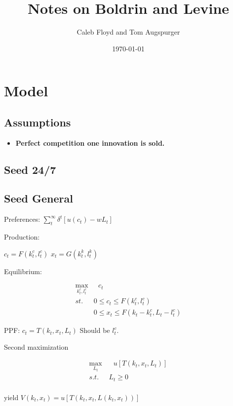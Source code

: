 \documentclass[11pt]{article}
\title{Notes on Boldrin and Levine}
\author{Caleb Floyd and Tom Augspurger}
\date{\today}
\begin{document}
\maketitle

\section{Model}
\label{sec:model}

\subsection{Assumptions}
\label{sub:assumptions}

  \begin{itemize}
    \item \textbf{Perfect competition one innovation is sold.}
  \end{itemize}
\subsection{Seed 24/7}
\label{sub:seed_24_7}

\subsection{Seed General}
\label{sub:seed_general}

  Preferences: $\sum_t^\infty \delta^t [u(c_t) - wL_t]$

  Production:

  $c_t = F(k_t^c, l_t^c)$
  $x_t = G(k_t^k, l_t^k)$

  Equilibrium:

  \begin{align}
    \max_{k^c_t, l^c_t} & \ \ \ c_t\\
    st. & 0 \leq c_t \leq F(k_t^c, l_t^c)\\
        & 0 \leq x_t \leq F(k_t - k_t^c, L_t - l_t^c)
  \end{align}

  PPF: $c_t = T(k_t, x_t, L_t)$ Should be $l^c_t$.

  Second maximization

  \begin{align}
    \max_{L_t} & \ \ \  u[T(k_t, x_t, L_t)] \\
    s.t. \ \ \ & L_t \geq 0\\
  \end{align}

  yield $V(k_t, x_t) = u[T(k_t, x_t, L(k_t, x_t))]$
\end{document}
